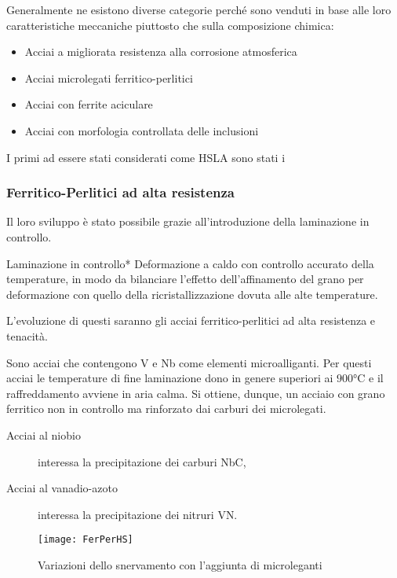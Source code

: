 Generalmente ne esistono diverse categorie perché sono venduti in base
alle loro caratteristiche meccaniche piuttosto che sulla composizione
chimica:
\begin{itemize}
\item Acciai a migliorata resistenza alla corrosione atmosferica
\item Acciai microlegati ferritico-perlitici
\item Acciai con ferrite aciculare
\item Acciai con morfologia controllata delle inclusioni
\end{itemize}

I primi ad essere stati considerati come \ac{HSLA} sono stati i 

\subsubsection{Ferritico-Perlitici ad alta resistenza}
Il loro sviluppo è stato possibile grazie all'introduzione della laminazione in controllo.

\begin{definition}{Laminazione in controllo}{*}
Deformazione a caldo con controllo accurato della temperature,
in modo da bilanciare l'effetto dell'affinamento del grano per
deformazione con quello della ricristallizzazione dovuta alle 
alte temperature.
\end{definition}

L'evoluzione di questi saranno gli acciai ferritico-perlitici
ad alta resistenza e tenacità.

Sono acciai che contengono V e Nb come elementi microalliganti.
Per questi acciai le temperature di fine laminazione dono in genere 
superiori ai $900\unit{\celsius}$ e il raffreddamento avviene in
aria calma.
Si ottiene, dunque, un acciaio con grano ferritico non in controllo ma
rinforzato dai carburi dei microlegati.
\begin{description}
\item[Acciai al niobio] interessa la precipitazione dei carburi NbC,
\item[Acciai al vanadio-azoto] interessa la precipitazione dei nitruri
VN.
\end{description}

\begin{figure}
\centering
\texttt{[image: FerPerHS]}
\caption{Variazioni dello snervamento con l'aggiunta di microleganti}
\label{fig:FerPerHS}
\end{figure}

